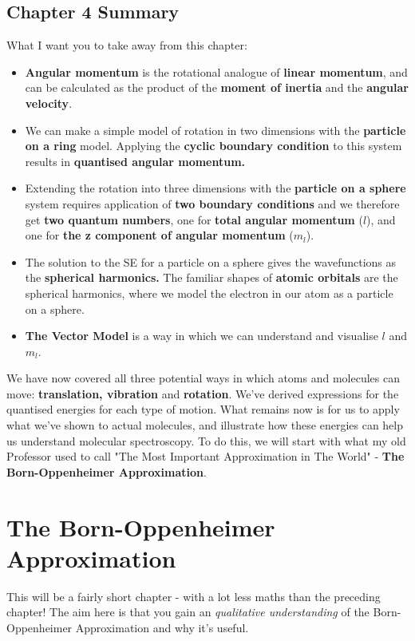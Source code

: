 \documentclass{memoir}[11pt,oneside,a4paper,openany]
\begin{document}
\section{Chapter 4 Summary}
What I want you to take away from this chapter:
\begin{itemize}
	\item  \textbf{Angular momentum} is the rotational analogue of \textbf{linear momentum}, and can be calculated as the product of the \textbf{moment of inertia} and the \textbf{angular velocity}.
	\item We can make a simple model of rotation in two dimensions with the \textbf{particle on a ring} model. Applying the \textbf{cyclic boundary condition} to this system results in \textbf{quantised angular momentum.}
	\item Extending the rotation into three dimensions with the \textbf{particle on a sphere} system requires application of \textbf{two boundary conditions} and we therefore get \textbf{two quantum numbers}, one for \textbf{total angular momentum} ($l$), and one for \textbf{the z component of angular momentum} ($m_l$). 
	\item The solution to the SE for a particle on a sphere gives the wavefunctions as the \textbf{spherical harmonics.} The familiar shapes of \textbf{atomic orbitals} are the spherical harmonics, where we model the electron in our atom as a particle on a sphere.
	\item \textbf{The Vector Model} is a way in which we can understand and visualise $l$ and $m_l$. 
\end{itemize}

We have now covered all three potential ways in which atoms and molecules can move: \textbf{translation, vibration} and \textbf{rotation}. We've derived expressions for the quantised energies for each type of motion. What remains now is for us to apply what we've shown to actual molecules, and illustrate how these energies can help us understand molecular spectroscopy. To do this, we will start with what my old Professor used to call "The Most Important Approximation in The World" - \textbf{The Born-Oppenheimer Approximation}.

\chapter{The Born-Oppenheimer Approximation}
This will be a fairly short chapter - with a lot less maths than the preceding chapter! The aim here is that you gain an \emph{qualitative understanding} of the Born-Oppenheimer Approximation and why it's useful.
\end{document}
